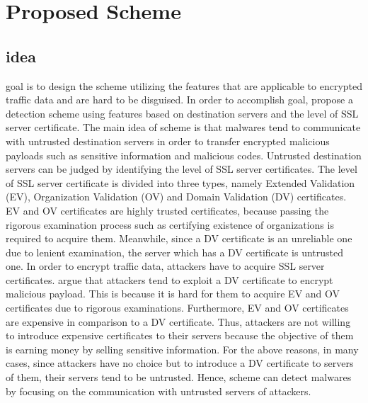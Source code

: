 \chapter{Proposed Scheme}\label{sec:proposed_scheme}

\section{idea}
\Our goal is to design the scheme utilizing the features that are applicable to encrypted traffic data and are hard to be disguised.
In order to accomplish \our goal, \we propose a detection scheme using features based on destination servers and the level of SSL server certificate.  
The main idea of \our scheme is that malwares tend to communicate with untrusted destination servers in order to transfer encrypted malicious payloads such as sensitive information and malicious codes.  
Untrusted destination servers can be judged by identifying the level of SSL server certificates.  
The level of SSL server certificate is divided into three types, namely Extended Validation (EV), Organization Validation (OV) and Domain Validation (DV) certificates.
EV and OV certificates are highly trusted certificates, because passing the rigorous examination process such as certifying existence of organizations is required to acquire them. 
Meanwhile, since a DV certificate is an unreliable one due to lenient examination, the server which has a DV certificate is untrusted one.
In order to encrypt traffic data, attackers have to acquire SSL server certificates.
\We argue that attackers tend to exploit a DV certificate to encrypt malicious payload.
This is because it is hard for them to acquire EV and OV certificates due to rigorous examinations.
Furthermore, EV and OV certificates are expensive in comparison to a DV certificate.
Thus, attackers are not willing to introduce expensive certificates to their servers because the objective of them is earning money by selling sensitive information.
For the above reasons, in many cases, since attackers have no choice but to introduce a DV certificate to servers of them, their servers tend to be untrusted.
Hence, \our scheme can detect malwares by focusing on the communication with untrusted servers of attackers.


